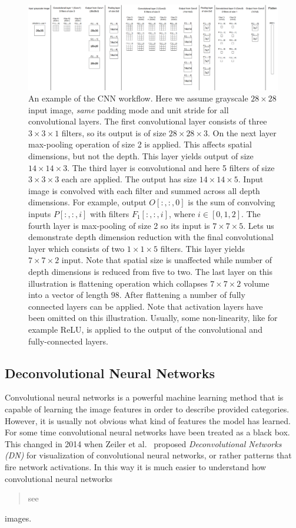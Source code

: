\documentclass[a4paper, 11pt, table]{article}
\begin{document}
\begin{landscape}
\begin{figure}[H]
\centering
\includegraphics[width=\linewidth]{conv_net.png} 
\caption{An example of the CNN workflow. Here we assume grayscale $28 \times 28$ input image, \textit{same} padding mode and unit stride for all convolutional layers. The first convolutional layer consists of three $3 \times 3 \times 1$ filters, so its output is of size $28 \times 28 \times 3$. On the next layer max-pooling operation of size 2 is applied. This affects spatial dimensions, but not the depth. This layer yields output of size $14 \times 14 \times 3$. The third layer is convolutional and here 5 filters of size $3 \times 3 \times 3$ each are applied. The output has size $14 \times 14 \times 5$. Input image is convolved with each filter and summed across all depth dimensions. For example, output $O[:, :, 0]$ is the sum of convolving inputs $P[:, :, i]$ with filters $F_1[:, :, i]$, where $i \in [0, 1, 2]$. The fourth layer is max-pooling of size 2 so its input is $7 \times 7 \times 5$. Lets us demonstrate depth dimension reduction with the final convolutional layer which consists of two $1 \times 1 \times 5$ filters. This layer yields $7 \times 7 \times 2$ input. Note that spatial size is unaffected while number of depth dimensions is reduced from five to two. The last layer on this illustration is flattening operation which collapses $7 \times 7 \times 2$ volume into a vector of length $98$. After flattening a number of fully connected layers can be applied. Note that activation layers have been omitted on this illustration. Usually, some non-linearity, like for example ReLU, is applied to the output of the convolutional and fully-connected layers.}
\label{fig:conv_net}
\end{figure}
\end{landscape} 


\subsection{Deconvolutional Neural Networks}
Convolutional neural networks is a powerful machine learning method that is capable of learning the image features in order to describe provided categories. However, it is usually not obvious what kind of features the model has learned. For some time convolutional neural networks have been treated as a black box. This changed in 2014 when Zeiler et al.~\cite{Zeiler2014} proposed \textit{Deconvolutional Networks (DN)} for visualization of convolutional  neural networks, or rather patterns that fire network activations. In this way it is much easier to understand how convolutional neural networks \blockquote{see} images. 
\end{document}
